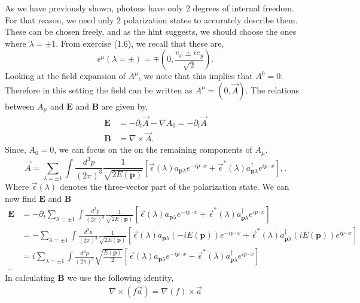 \documentclass[working, oneside]{../../../Preambles/tuftebook}
\begin{document}
\begin{solution}
As we have previously shown, photons have only 2 degrees of internal freedom. For that reason, we need only 2 polarization states to accurately describe them. These can be chosen freely, and as the hint suggests, we should choose the ones where $\lambda = \pm 1$. From exercise (1.6), we recall that these are,
\[
\epsilon^{\mu }\left( \lambda = \pm \right) = \mp\left( 0, \frac{e_x \pm ie_y}{\sqrt{2} } \right) 
.\] 
Looking at the field expansion of $A^{\mu }$, we note that this implies that $A^{0} = 0$. Therefore in this setting the field can be written as $A^{\mu } = \left( 0, \vec{A} \right) $. The relations between $A_{\mu } $ and $\mathbf{E}$ and $\mathbf{B}$ are given by,
\begin{align*}
    \mathbf{E} &= - \partial_t \vec{A} - \nabla A_{0} = -\partial_t \vec{A} \\
    \mathbf{B} &= \nabla \times \vec{A}
.\end{align*}
Since, $A_0 = 0$, we can focus on the on the remaining components of $A_{\mu }$.
\[
\vec{A}=\sum_{\lambda = \pm 1}\int\frac{d^3p}{(2\pi)^3}\frac{1}{\sqrt{2E(\bm p)}}\left[\vec{\epsilon}(\lambda)a_{\bm p\lambda}e^{-ip\cdot x}+\vec{\epsilon}^{*}(\lambda)a_{\bm p\lambda}^{\dagger}e^{ip\cdot x} \right],
.\] 
Where $\vec{\epsilon}\left( \lambda \right) $ denotes the three-vector part of the polarization state. We can now find $\mathbf{E}$ and $\mathbf{B}$
\begin{align*}
    \mathbf{E} &= -\partial_t\sum_{\lambda = \pm 1}\int\frac{d^3p}{(2\pi)^3}\frac{1}{\sqrt{2E(\bm p)}}\left[\vec{\epsilon}(\lambda)a_{\bm p\lambda}e^{-ip\cdot x}+\vec{\epsilon}^{*}(\lambda)a_{\bm p\lambda}^{\dagger}e^{ip\cdot x} \right] \\
    &=  -\sum_{\lambda = \pm 1}\int\frac{d^3p}{(2\pi)^3}\frac{1}{\sqrt{2E(\bm p)}}\left[\vec{\epsilon}(\lambda)a_{\bm p\lambda}\left( -iE\left( \mathbf{p} \right)  \right) e^{-ip\cdot x}+\vec{\epsilon}^{*}(\lambda)a_{\bm p\lambda}^{\dagger}\left( iE\left( \mathbf{p} \right)  \right) e^{ip\cdot x} \right] \\
    &=  i\sum_{\lambda = \pm 1}\int\frac{d^3p}{(2\pi)^3}\sqrt{\frac{E\left( \mathbf{p} \right) }{2}} \left[\vec{\epsilon}(\lambda)a_{\bm p\lambda} e^{-ip\cdot x}-\vec{\epsilon}^{*}(\lambda)a_{\bm p\lambda}^{\dagger} e^{ip\cdot x} \right] \\
.\end{align*}
In calculating $\mathbf{B}$ we use the following identity,
\begin{align*}
    \nabla \times \left( f\vec{a} \right) =  \nabla \left( f \right) \times  \vec{a}

\end{align*}
\end{solution}
\end{document}

